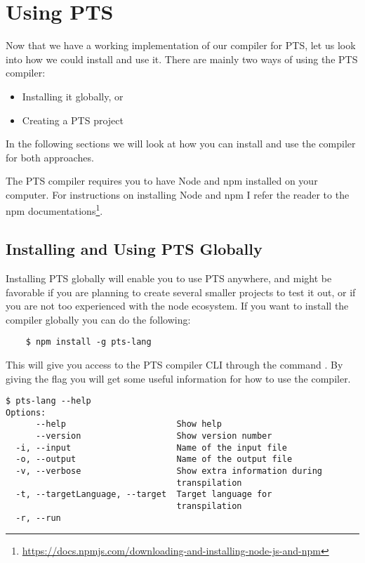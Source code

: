
\chapter{Using PTS}\label{ch:using-pts}

Now that we have a working implementation of our compiler for PTS, let us look into how we could install and use it.
There are mainly two ways of using the PTS compiler:

\begin{itemize}
    \item Installing it globally, or
    \item Creating a PTS project
\end{itemize}

In the following sections we will look at how you can install and use the compiler for both approaches.

The PTS compiler requires you to have Node and npm installed on your computer.
For instructions on installing Node and npm I refer the reader to the npm documentations\footnote{\url{https://docs.npmjs.com/downloading-and-installing-node-js-and-npm}}.

\section{Installing and Using PTS Globally}\label{sec:installing-and-using-pts-globally}

Installing PTS globally will enable you to use PTS anywhere, and might be favorable if you are planning to create several smaller projects to test it out, or if you are not too experienced with the node ecosystem.
If you want to install the compiler globally you can do the following:

\begin{verbatim}
    $ npm install -g pts-lang
\end{verbatim}

This will give you access to the PTS compiler CLI through the command .
By giving the  flag you will get some useful information for how to use the compiler.

\begin{verbatim}
$ pts-lang --help
Options:
      --help                      Show help
      --version                   Show version number
  -i, --input                     Name of the input file
  -o, --output                    Name of the output file
  -v, --verbose                   Show extra information during
                                  transpilation
  -t, --targetLanguage, --target  Target language for
                                  transpilation
  -r, --run
\end{verbatim}

